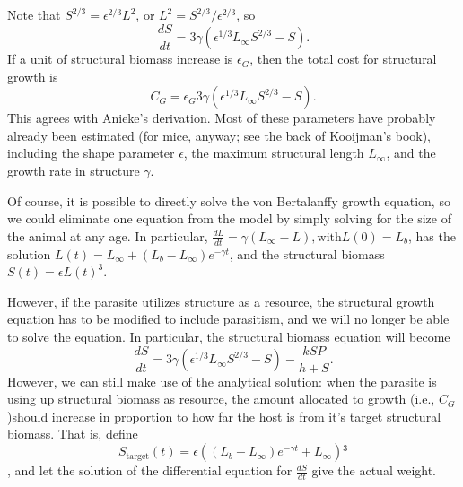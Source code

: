 \documentclass[11pt,reqno,final,pdftex]{amsart}\usepackage[]{graphicx}\usepackage[]{color}
\theoremstyle{plain}
\numberwithin{equation}{part}
\begin{document}
Note that $S^{2/3}=\epsilon ^{2/3}L^2$, or $L^2=S^{2/3}/\epsilon ^{2/3}$, so
\begin{equation}
\frac{dS}{dt}=3\gamma  \left(\epsilon ^{1/3}L_{\infty }S^{2/3}-S\right).
\end{equation}
If a unit of structural biomass increase is $\epsilon _G$, then the total cost for structural growth is
\begin{equation}
C_G = \epsilon _G 3\gamma  \left(\epsilon ^{1/3}L_{\infty }S^{2/3}-S\right).
\end{equation}
This agrees with Anieke's derivation.
Most of these parameters have probably already been estimated (for mice, anyway; see the back of Kooijman's book), including the shape parameter $\epsilon$, the maximum structural length $L_{\infty }$, and the growth rate in structure $\gamma$.

Of course, it is possible to directly solve the von Bertalanffy growth equation, so we could eliminate one equation from the model by simply solving for the size of the animal at any age.
In particular, $\frac{dL}{dt}=\gamma \left(L_{\infty }-L\right), \text{with} L(0)=L_b$, has the solution $L(t)=L_{\infty }+\left(L_b-L_{\infty}\right)e^{-\gamma t}$, and the structural biomass $S(t)=\epsilon  L(t)^3$.

However, if the parasite utilizes structure as a resource, the structural growth equation has to be modified to include parasitism, and we will no longer be able to solve the equation.
In particular, the structural biomass equation will become
\begin{equation}
\frac{dS}{dt}=3\gamma  \left(\epsilon ^{1/3}L_{\infty }S^{2/3}-S\right)-\frac{k S P}{h+S}.
\end{equation}
However, we can still make use of the analytical solution: when the parasite is using up structural biomass as resource, the amount allocated to growth (i.e., $C_G$)should increase in proportion to how far the host is from it's target structural biomass.
That is, define
\begin{equation}
S_{\text{target}}(t)=\epsilon \left(\left(L_b-L_{\infty }\right) e^{-\gamma  t}+L_{\infty }\right){}^3
\end{equation}, and let the solution of the differential equation for $\frac{dS}{dt}$ give the actual weight.
\end{document}
